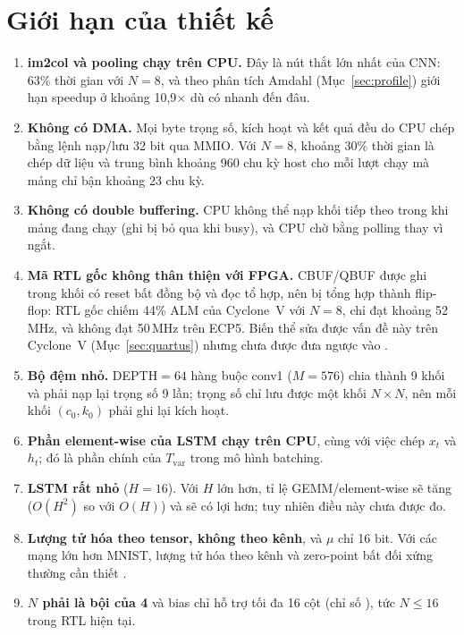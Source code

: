 \section{Giới hạn của thiết kế}
\begin{enumerate}
  \item \textbf{im2col và pooling chạy trên CPU.} Đây là nút thắt lớn nhất của CNN: 63\% thời gian với $N=8$, và theo phân tích Amdahl (Mục~\ref{sec:profile}) giới hạn speedup ở khoảng 10,9$\times$ dù \NPU{} có nhanh đến đâu.
  \item \textbf{Không có DMA.} Mọi byte trọng số, kích hoạt và kết quả đều do CPU chép bằng lệnh nạp/lưu 32 bit qua MMIO. Với $N=8$, khoảng 30\% thời gian là chép dữ liệu và trung bình khoảng 960 chu kỳ host cho mỗi lượt chạy mà mảng chỉ bận khoảng 23 chu kỳ.
  \item \textbf{Không có double buffering.} CPU không thể nạp khối tiếp theo trong khi mảng đang chạy (ghi bị bỏ qua khi busy), và CPU chờ bằng polling thay vì ngắt.
  \item \textbf{Mã RTL gốc không thân thiện với FPGA.} CBUF/QBUF được ghi trong khối có reset bất đồng bộ và đọc tổ hợp, nên bị tổng hợp thành flip-flop: RTL gốc chiếm 44\% ALM của Cyclone~V với $N=8$, chỉ đạt khoảng 52\,MHz, và không đạt 50\,MHz trên ECP5. Biến thể  sửa được vấn đề này trên Cyclone~V (Mục~\ref{sec:quartus}) nhưng chưa được đưa ngược vào .
  \item \textbf{Bộ đệm nhỏ.} DEPTH$=64$ hàng buộc conv1 ($M=576$) chia thành 9 khối và phải nạp lại trọng số 9 lần; trọng số chỉ lưu được một khối $N\times N$, nên mỗi khối $(c_0,k_0)$ phải ghi lại kích hoạt.
  \item \textbf{Phần element-wise của LSTM chạy trên CPU}, cùng với việc chép $x_t$ và $h_t$; đó là phần chính của $T_\text{var}$ trong mô hình batching.
  \item \textbf{LSTM rất nhỏ} ($H=16$). Với $H$ lớn hơn, tỉ lệ GEMM/element-wise sẽ tăng ($O(H^2)$ so với $O(H)$) và \NPU{} sẽ có lợi hơn; tuy nhiên điều này chưa được đo.
  \item \textbf{Lượng tử hóa theo tensor, không theo kênh}, và $\mu$ chỉ 16 bit. Với các mạng lớn hơn MNIST, lượng tử hóa theo kênh và zero-point bất đối xứng thường cần thiết \cite{krishnamoorthi2018}.
  \item \textbf{$N$ phải là bội của 4} và bias chỉ hỗ trợ tối đa 16 cột (chỉ số ), tức $N\le16$ trong RTL hiện tại.
\end{enumerate}

